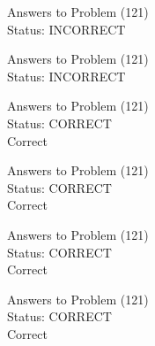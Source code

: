 \documentclass[11pt]{article}
\begin{document}
\begin{minipage}[t]{0.5\textwidth}
  {\centering
  
  Answers to Problem (121)\\
  Status: INCORRECT\\
  
  }
\end{minipage}
\begin{minipage}[t]{0.5\textwidth}
  {\centering
  
  Answers to Problem (121)\\
  Status: INCORRECT\\
  
  }
\end{minipage}
\begin{minipage}[t]{0.5\textwidth}
  {\centering
  
  Answers to Problem (121)\\
  Status: CORRECT\\
  Correct\\
  }
\end{minipage}
\begin{minipage}[t]{0.5\textwidth}
  {\centering
  
  Answers to Problem (121)\\
  Status: CORRECT\\
  Correct\\
  }
\end{minipage}
\begin{minipage}[t]{0.5\textwidth}
  {\centering
  
  Answers to Problem (121)\\
  Status: CORRECT\\
  Correct\\
  }
\end{minipage}
\begin{minipage}[t]{0.5\textwidth}
  {\centering
  
  Answers to Problem (121)\\
  Status: CORRECT\\
  Correct\\
  }
\end{minipage}
\end{document}
